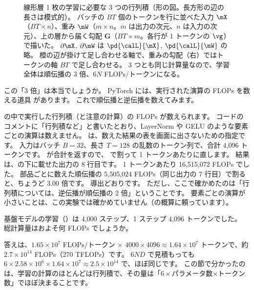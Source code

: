 \begin{figure}[!tbp]
\caption{線形層 1 枚の学習に必要な 3 つの行列積（形の図。長方形の辺の長さは模式的）。
バッチの $BT$ 個のトークンを行に並べた入力 $\mX$（$BT\times n$）、重み $\mW$（$m\times n$。$m$ は出力の次元、$n$ は入力の次元）、上の層から届く勾配 $\bm{G}$（$BT\times m$。各行が 1 トークンの $\vg$）で描いた。
$\partial\mX$, $\partial\mW$ は $\pd{\calL}{\mX}$, $\pd{\calL}{\mW}$ の略。
橙の辺が掛けて足し合わせる軸で、重みの勾配（右）ではトークンの軸 $BT$ で足し合わせる。
3 つとも同じ計算量なので、学習全体は順伝播の 3 倍、$6N$ FLOPs/トークンになる。}
\label{fig:gpu-6n}
\end{figure}

この「3 倍」は本当でしょうか。
PyTorch には、実行された演算の FLOPs を数える道具  があります。
これで順伝播と逆伝播を数えてみます。


 の中で実行した行列積（と注意の計算）の FLOPs が数えられます。
コードのコメントに「行列積など」と書いたとおり、LayerNorm や GELU のような要素ごとの演算は数えません。
 は、数えた結果の表を画面に出さないための指定です。
入力はバッチ $B=32$、長さ $T=128$ の乱数のトークン列で、合計 4,096 トークンです。
 が合計を返すので、 で割って 1 トークンあたりに直します。
結果は、の下に載せた出力の 8 行目です。
1 トークンあたり 16,515,072 FLOPs でした。
部品ごとに数えた順伝播の 5,505,024 FLOPs（同じ出力の 7 行目）で割ると、ちょうど 3.00 倍です。
導出どおりです。
ただし、ここで確かめたのは「行列積については、逆伝播が順伝播の 2 倍」ということです。
要素ごとの演算が小さいことは、この実験では確かめていません（の概算に頼っています）。

\begin{quiz}
基盤モデルの学習（）は 4,000 ステップ、1 ステップ 4,096 トークンでした。
総計算量はおよそ何 FLOPs でしょうか。
\end{quiz}

答えは、$1.65\times10^{7}$ FLOPs/トークン $\times$ $4000\times4096\approx1.64\times10^{7}$ トークンで、約 $2.7\times10^{14}$ FLOPs（270 TFLOPs）です。
$6ND$ で見積もっても $6\times2.58\times10^{6}\times1.64\times10^{7}\approx2.5\times10^{14}$ で、ほぼ同じです。
この節で分かったのは、学習の計算のほとんどは行列積で、その量は「$6\times$パラメータ数$\times$トークン数」でほぼ決まることです。

